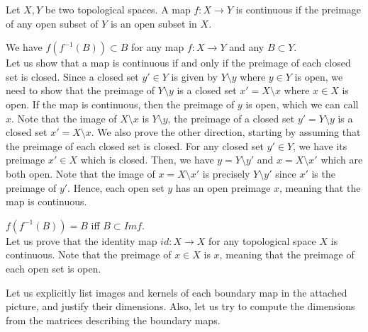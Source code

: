 \documentclass[document]{article}
\begin{document}
\begin{definition}
\end{definition}

\begin{definition}
Let $X, Y$ be two topological spaces. A map $f:X\rightarrow Y$ is continuous if the preimage of any open subset of $Y$ is an open subset in $X$.
\end{definition}

\begin{problem}[9.A] We have $f(f^{-1}(B)) \subset B$ for any map $f:X \rightarrow Y$ and any $B \subset Y$.\\


Let us show that a map is continuous if and only if the preimage of each closed set is closed. Since a closed set $y'\in Y$ is given by $Y\setminus y$ where $y\in Y$ is open, we need to show that the preimage of $Y \setminus y$ is a closed set $x'=X \setminus x$ where $x\in X$ is open. If the map is continuous, then the preimage of $y$ is open, which we can call $x$. Note that the image of $X\setminus x$ is $Y \setminus y$, the preimage of a closed set $y'=Y\setminus y$ is a closed set $x'=X\setminus x$. We also prove the other direction, starting by assuming that the preimage of each closed set is closed. For any closed set $y'\in Y$, we have its preimage $x'\in X$ which is closed. Then, we have $y=Y\setminus y'$ and $x=X\setminus x'$ which are both open. Note that the image of $x=X\setminus x'$ is precisely $Y\setminus y'$ since $x'$ is the preimage of $y'$. Hence, each open set $y$ has an open preimage $x$, meaning that the map is continuous.
\end{problem}

\begin{problem}[9.B] $f(f^{-1}(B)) = B$ iff $B \subset Im f$.\\


Let us prove that the identity map $id: X \rightarrow X$ for any topological space $X$ is continuous. Note that the preimage of $x\in X$ is $x$, meaning that the preimage of each open set is open.
\end{problem}

\begin{problem}[4]
Let us explicitly list images and kernels of each boundary map in the attached picture, and justify their dimensions. Also, let us try to compute the dimensions from the matrices describing the boundary maps.
\end{problem}

\begin{problem}
\end{problem}

\begin{problem}
\end{problem}
\end{document}
